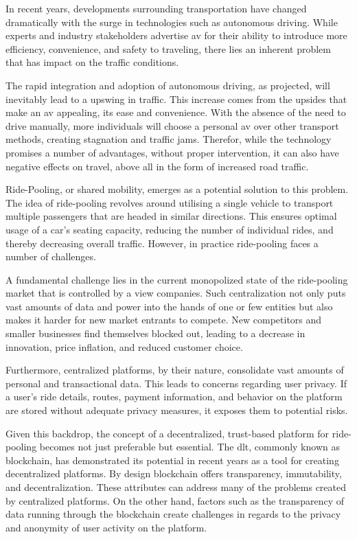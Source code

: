 In recent years, developments surrounding transportation have changed dramatically with the surge in technologies such as autonomous driving. While experts and industry stakeholders advertise \gls{av} for their ability to introduce more efficiency, convenience, and safety to traveling, there lies an inherent problem that has impact on the traffic conditions.

The rapid integration and adoption of autonomous driving, as projected, will inevitably lead to a upswing in traffic. This increase comes from the upsides that make an \gls{av} appealing, its ease and convenience. With the absence of the need to drive manually, more individuals will choose a personal \gls{av} over other  transport methods, creating stagnation and traffic jams. Therefor, while the technology promises a number of advantages, without proper intervention, it can also have negative effects on  travel, above all in the form of  increased road traffic.

Ride-Pooling, or shared mobility, emerges as a potential solution to this problem. The idea of ride-pooling revolves around utilising a single vehicle to transport multiple passengers that are headed in similar directions. This ensures optimal usage of a car's seating capacity, reducing the number of individual rides, and thereby decreasing overall traffic. However, in practice ride-pooling faces a number of challenges.

A fundamental challenge lies in the current monopolized state of the ride-pooling market that is controlled by a view companies. Such centralization not only puts vast amounts of data and power into the hands of one or few entities but also makes it harder for new market entrants to compete. New competitors and smaller businesses find themselves blocked out, leading to a decrease in innovation,  price inflation, and reduced customer choice.

Furthermore, centralized platforms, by their nature, consolidate vast amounts of personal and transactional data. This leads to concerns regarding user privacy. If a user’s ride details, routes, payment information, and behavior on the platform are stored without adequate privacy measures, it exposes them to potential risks.

Given this backdrop, the concept of a decentralized, trust-based platform for ride-pooling becomes not just preferable but essential. The \gls{dlt}, commonly known as blockchain, has demonstrated its potential in recent years as a tool for creating decentralized platforms. By design blockchain offers transparency, immutability, and decentralization. These attributes can address many of the problems created by centralized platforms. On the other hand, factors such as the  transparency of data running through the blockchain create challenges in regards to the privacy and anonymity of user activity on the platform.

